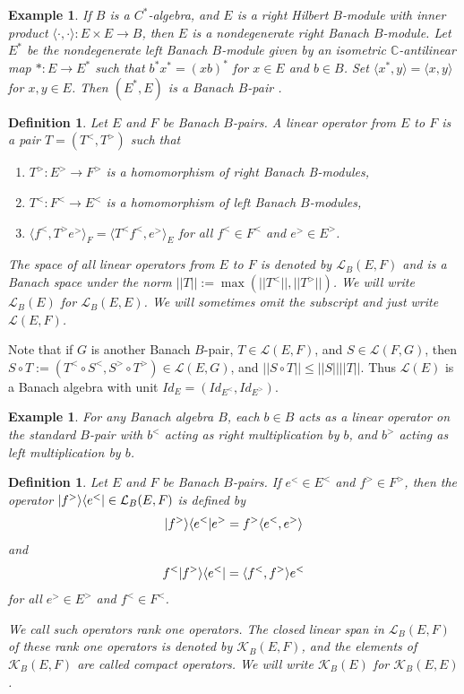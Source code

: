 \documentclass[a4,11pt]{amsart}
\newtheorem{ex}[thm]{Example}
\newtheorem{defn}[thm]{Definition}
\theoremstyle{remark}
\DeclarePairedDelimiter\bra{\langle}{\rvert}
\DeclarePairedDelimiter\ket{\lvert}{\rangle}
\begin{document}
\begin{ex} \label{ex:Cstar}
If $B$ is a $C^*$-algebra, and $E$ is a right Hilbert $B$-module with inner product $\langle\cdot,\cdot\rangle:E\times E\rightarrow B$, then $E$ is a nondegenerate right Banach $B$-module.
Let $E^*$ be the nondegenerate left Banach $B$-module given by an isometric $\mathbb{C}$-antilinear map $*:E\rightarrow E^*$ such that $b^*x^*=(xb)^*$ for $x\in E$ and $b\in B$.
Set $\langle x^*,y\rangle=\langle x,y \rangle$ for $x,y\in E$.
Then $(E^*,E)$ is a Banach $B$-pair \cite[Proposition 1.1.4]{Laf02}.
\end{ex}

\begin{defn}
Let $E$ and $F$ be Banach $B$-pairs. A linear operator from $E$ to $F$ is a pair $T=(T^<,T^>)$ such that 
\begin{enumerate}
\item $T^>:E^>\rightarrow F^>$ is a homomorphism of right Banach B-modules,
\item $T^<:F^<\rightarrow E^<$ is a homomorphism of left Banach $B$-modules,
\item $\langle f^<,T^>e^> \rangle_F=\langle T^<f^<,e^> \rangle_E$ for all $f^<\in F^<$ and $e^>\in E^>$.
\end{enumerate}

The space of all linear operators from $E$ to $F$ is denoted by $\mathcal{L}_B(E,F)$ and is a Banach space under the norm $||T||:=\max(||T^<||,||T^>||)$. We will write $\mathcal{L}_B(E)$ for $\mathcal{L}_B(E,E)$. We will sometimes omit the subscript and just write $\mathcal{L}(E,F)$.
\end{defn}

Note that if $G$ is another Banach $B$-pair, $T\in\mathcal{L}(E,F)$, and $S\in\mathcal{L}(F,G)$, then $S\circ T:=(T^<\circ S^<,S^>\circ T^>)\in\mathcal{L}(E,G)$, and $||S\circ T||\leq ||S|| ||T||$. Thus $\mathcal{L}(E)$ is a Banach algebra with unit $Id_E=(Id_{E^<},Id_{E^>})$.

\begin{ex}
For any Banach algebra $B$, each $b\in B$ acts as a linear operator on the standard $B$-pair with $b^<$ acting as right multiplication by $b$, and $b^>$ acting as left multiplication by $b$.
\end{ex}

\begin{defn}
Let $E$ and $F$ be Banach $B$-pairs. If $e^<\in E^<$ and $f^>\in F^>$, then the operator $\ket{f^>}\bra{e^<}\in\mathcal{L}_B(E,F)$ is defined by \[\ket{f^>}\bra{e^<}e^>=f^>\langle e^<,e^> \rangle\] and \[f^<\ket{f^>}\bra{e^<}=\langle f^<,f^> \rangle e^<\] for all $e^>\in E^>$ and $f^<\in F^<$.

We call such operators rank one operators. The closed linear span in $\mathcal{L}_B(E,F)$ of these rank one operators is denoted by $\mathcal{K}_B(E,F)$, and the elements of $\mathcal{K}_B(E,F)$ are called compact operators. We will write $\mathcal{K}_B(E)$ for $\mathcal{K}_B(E,E)$.
\end{defn}
\end{document}
